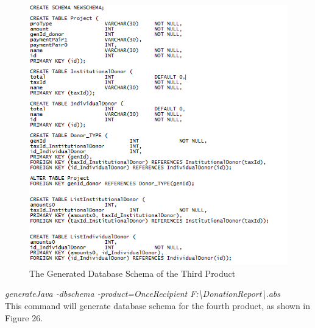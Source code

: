 \documentclass[runningheads,a4paper]{llncs}
\begin{document}
\begin{figure}
	\centering
	\includegraphics[scale=0.7]{create3.png}
	\caption{The Generated Database Schema of the Third Product}
	\label{Figure 25}
\end{figure}

\emph{generateJava -dbschema -product=OnceRecipient F:\textbackslash DonationReport\textbackslash *.abs}\\

This command will generate database schema for the fourth product, as shown in Figure 26.\\
\end{document}

